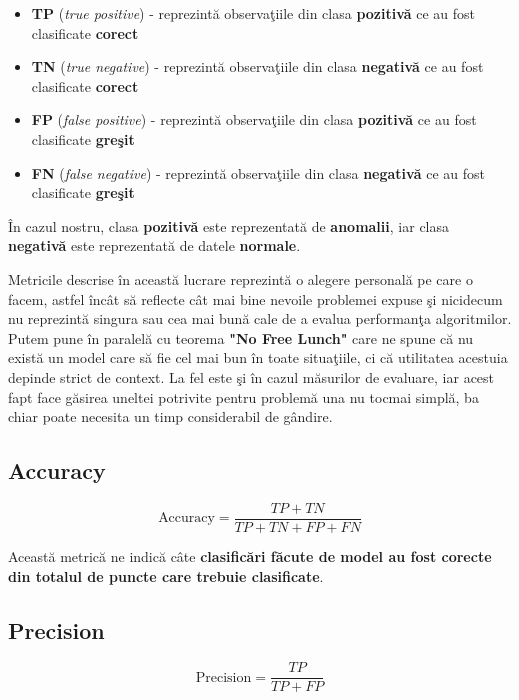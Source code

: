 \begin{itemize}
    \item \textbf{TP} (\textit{true positive}) - reprezintă observaţiile din clasa 
    \textbf{pozitivă} ce au fost clasificate \textbf{corect}
    \item \textbf{TN} (\textit{true negative}) - reprezintă observaţiile din clasa 
    \textbf{negativă} ce au fost clasificate \textbf{corect}
    \item \textbf{FP} (\textit{false positive}) - reprezintă observaţiile din clasa 
    \textbf{pozitivă} ce au fost clasificate \textbf{greşit}
    \item \textbf{FN} (\textit{false negative}) - reprezintă observaţiile din clasa 
    \textbf{negativă} ce au fost clasificate \textbf{greşit}
\end{itemize}
În cazul nostru, clasa \textbf{pozitivă} este reprezentată de \textbf{anomalii}, iar 
clasa \textbf{negativă} este reprezentată de datele \textbf{normale}.

Metricile descrise în această lucrare reprezintă o alegere personală pe care o facem, astfel
încât să reflecte cât mai bine nevoile problemei expuse şi nicidecum nu reprezintă singura
sau cea mai bună cale de a evalua performanţa algoritmilor. Putem pune în paralelă cu teorema
\textbf{"No Free Lunch"} care ne spune că nu există un model care să fie cel mai bun în toate situaţiile,
ci că utilitatea acestuia depinde strict de context. La fel este şi în cazul măsurilor de evaluare,
iar acest fapt face găsirea uneltei potrivite pentru problemă una nu tocmai simplă, ba chiar 
poate necesita un timp considerabil de gândire.

\subsection{Accuracy}

\begin{equation}
    \text{Accuracy} = \frac{TP + TN}{TP + TN + FP + FN}
\end{equation}

Această metrică ne indică câte 
\textbf{clasificări făcute de model au fost corecte din 
totalul de puncte care trebuie clasificate}.

\subsection{Precision}

\begin{equation}
    \text{Precision} = \frac{TP}{TP + FP}
\end{equation}

